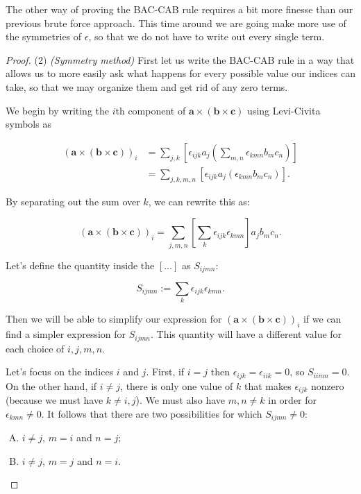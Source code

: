 The other way of proving the BAC-CAB rule requires a bit more finesse than our previous brute force approach.  This time around we are going make more use of the symmetries of 
$\epsilon$, so that we do not have to write out every single term.  

\begin{proof}(2) \emph{(Symmetry method)}
First let us write the BAC-CAB rule in a way that allows us to more easily ask what happens for every 
possible value our indices can take, so that we may organize them and get rid of any zero terms.

We begin by writing the $i$th component of $\textbf{a} \times (\textbf{b} \times \textbf{c})$ using Levi-Civita symbols as %

\begin{align*}
 \left( \textbf{a} \times (\textbf{b} \times \textbf{c}) \right)_i &=\sum_{j,k} \left[ \epsilon_{ijk} a_j \left( \sum_{m,n}\epsilon_{kmn} b_m c_n \right)\right] \\
&=\sum_{j,k,m,n} \left[ \epsilon_{ijk} a_j \left( \epsilon_{kmn} b_m c_n \right)\right].
\end{align*}

By separating out the sum over $k$, we can rewrite this as: 

\[ \left( \textbf{a} \times (\textbf{b} \times \textbf{c}) \right)_i =  \sum_{j,m,n} \left[ \sum_k \epsilon_{ijk} \epsilon_{kmn} \right] a_j b_m c_n. \]

Let's define the quantity inside the $[ \dots ]$ as $S_{ijmn}$:

	\[ S_{ijmn} :=  \sum_k \epsilon_{ijk} \epsilon_{kmn}. \]

Then we will be able to simplify our expression for $\left( \textbf{a} \times (\textbf{b} \times \textbf{c}) \right)_i$ if we can find a simpler expression for $S_{ijmn}$.  This quantity will have a different value for each choice of $i,j,m,n$.  

Let's focus on the indices $i$ and $j$. First, if $i=j$
then  $\epsilon_{ijk} =  \epsilon_{iik} = 0$, so $S_{iimn} = 0$.  On the other hand, if $i \neq j$, there is only one value of $k$ that makes $\epsilon_{ijk}$ nonzero (because we must have $k \neq i,j$). We must also have $m,n \neq k$ in 
order for $\epsilon_{kmn} \neq 0$.  It follows that there are two possibilities for which $S_{ijmn} \neq 0$:  
\begin{enumerate}[(A)]
\item
$i \neq j$, $m=i$ and $n=j$;
\item
$i \neq j$, $m=j$ and $n=i$.
\end{enumerate}


\end{proof}
